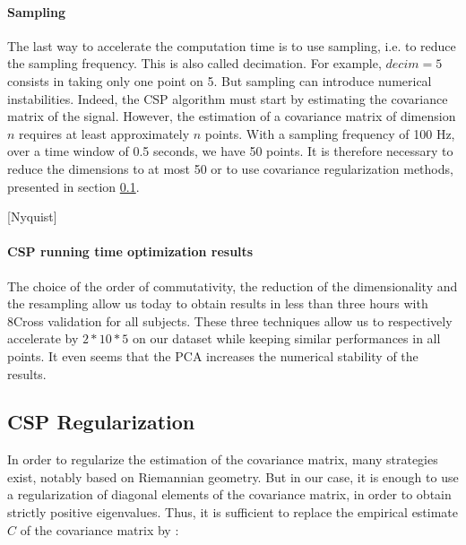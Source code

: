 \paragraph{Sampling}

The last way to accelerate the computation time is to use sampling, i.e. to reduce the sampling frequency. This is also called decimation. For example, $decim = 5$ consists in taking only one point on 5. But sampling can introduce numerical instabilities. Indeed, the CSP algorithm must start by estimating the covariance matrix of the signal. However, the estimation of a covariance matrix of dimension $n$ requires at least approximately $n$ points. With a sampling frequency of 100 Hz, over a time window of 0.5 seconds, we have 50 points. It is therefore necessary to reduce the dimensions to at most 50 or to use covariance regularization methods, presented in section \ref{CSP_regularization}.

[Nyquist]

\paragraph{CSP running time optimization results}

The choice of the order of commutativity, the reduction of the dimensionality and the resampling allow us today to obtain results in less than three hours with 8Cross validation for all subjects. These three techniques allow us to respectively accelerate by $2*10*5$ on our dataset while keeping similar performances in all points. It even seems that the PCA increases the numerical stability of the results.




\subsection{CSP Regularization}
\label{CSP_regularization}
In order to regularize the estimation of the covariance matrix, many strategies exist, notably based on Riemannian geometry. But in our case, it is enough to use a regularization of diagonal elements of the covariance matrix, in order to obtain strictly positive eigenvalues. Thus, it is sufficient to replace the empirical estimate $C$ of the covariance matrix by :

